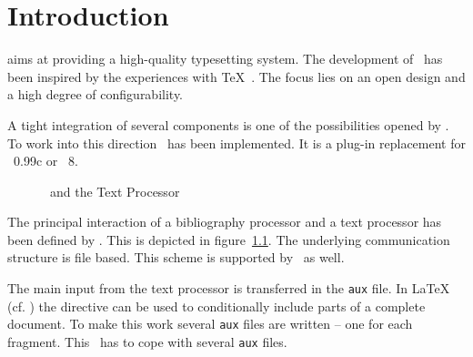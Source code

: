 
\chapter{Introduction}

\ExTeX{} aims at providing a high-quality
typesetting system. The development of \ExTeX\ has been inspired by
the experiences with \TeX\ \cite{knuth:texbook}. The focus lies on an
open design and a high degree of configurability.

A tight integration of several components is one of the possibilities
opened by \ExTeX. To work into this direction \ExBib\ has been
implemented. It is a plug-in replacement for
\BibTeX~0.99c\cite{btxdoc,btxhak}
or \BibTeX~8.

\begin{figure}[hb]
  \centering
  
  \caption{\ExBib\ and the Text Processor}%
  \label{fig:files}
\end{figure}
The principal interaction of a bibliography processor and a text
processor has been defined by
\BibTeX{}. This is depicted in
figure~\ref{fig:files}. The underlying communication structure is file
based. This scheme is supported by \ExBib\ as well.

The main input from the text processor is
transferred in the \texttt{aux} file. In \LaTeX{}
(cf. \cite{lamport:latex,goosens.mittelbach:latex.companion}) the
directive  can be used to conditionally include parts
of a complete document. To make this work several \texttt{aux} files
are written -- one for each fragment. This \ExBib\ has to cope with
several \texttt{aux} files.

